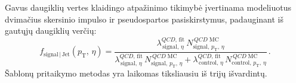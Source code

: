 \documentclass[a4paper, 12pt, oneside]{article}
\newcommand{\pT}{p_{\mathrm{T}}}
\newcommand{\QCD}{QC\! D}
\newlength\q
\begin{document}
\begin{enumerate}
	Gavus daugiklių vertes klaidingo atpažinimo tikimybė įvertinama modeliuotus dvimačius skersinio impulso ir pseudospartos pasiskirstymus,
	padauginant iš gautųjų daugiklių verčių:
	\begin{equation}
		f_{\mathrm{signal} \,| \,\mathrm{Jet}}(\pT, \, \eta) =
		\frac{\lambda^{\QCD,\,\mathrm{fit}}_{\,\mathrm{signal}, \, \eta}\, N^{\,\QCD \; \mathrm{MC}}_{\mathrm{signal}, \, \pT, \, \eta}}
		{\lambda^{\QCD,\,\mathrm{fit}}_{\,\mathrm{signal}, \, \eta}\, N^{\,\QCD \; \mathrm{MC}}_{\mathrm{signal}, \, \pT, \, \eta} +
		\lambda^{\QCD,\,\mathrm{fit}}_{\,\mathrm{control}, \, \eta}\, N^{\,\QCD \; \mathrm{MC}}_{\mathrm{control}, \, \pT, \, \eta}}\, .
	\end{equation}
	Šablonų pritaikymo metodas yra laikomas tiksliausiu iš trijų išvardintų.
\end{enumerate}
\end{document}
